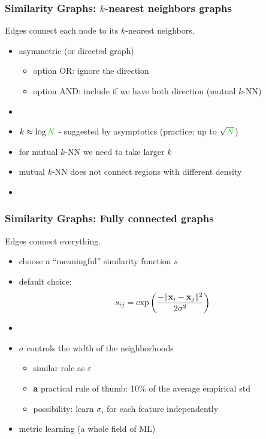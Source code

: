 \documentclass{beamer}
\begin{document}
\begin{frame}
\frametitle{Similarity Graphs: $k$-nearest neighbors  graphs}
\begin{block}{}
Edges connect each node to its $k$-nearest neighbors.
\end{block}
\pause
\begin{itemize}[<+-| alert@+>]\addtolength{\itemsep}{0.4\baselineskip}
\item asymmetric (or directed graph) 
\begin{itemize}
\item option OR: ignore the direction
\item option AND: include if we have both direction (mutual $k$-NN)  
\end{itemize}
\item {} 
\item $k \approx \log \nodes$ - suggested by asymptotics (practice: up to $\sqrt{\nodes}$)
\item for mutual $k$-NN we need to take larger $k$
\item mutual $k$-NN does not connect regions with different density 
\item {}
\end{itemize}
\end{frame}
\begin{frame}
\frametitle{Similarity Graphs: Fully connected graphs}
\begin{block}{}
Edges connect everything.
\end{block}
\pause
\begin{itemize}[<+-| alert@+>]%
\item choose a ``meaningful'' similarity function $s$  
\item default choice: \[s_{ij} = \exp\left(\frac{ -\| \mathbf{x}_i - \mathbf{x}_j\|^2}{2\sigma^2} \right) \]
\item {}
\item $\sigma$ controls the width of the neighborhoods
\begin{itemize}
\item similar role as $\varepsilon$
\item \textbf{a} practical rule of thumb: 10\% of the average empirical std 
\item possibility: learn  $\sigma_i$ for each feature independently
\end{itemize}
\item metric learning (a whole field of ML)
\end{itemize}
\end{frame}
\end{document}
